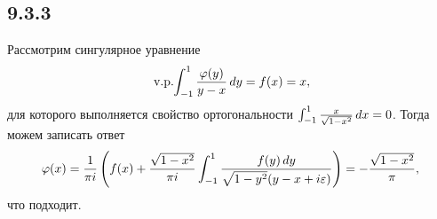 \subsection*{9.3.3}

Рассмотрим сингулярное уравнение
\begin{equation*}
	\,\textnormal{v.p.}\hspace{-2pt}\int_{-1}^{1} \frac{\varphi(y)}{y-x} \, d y = f(x) = x,
\end{equation*}
для которого выполняется свойство ортогональности $\int_{-1}^{1} \frac{x}{\sqrt{1-x^2}} \, d x = 0$. Тогда можем записать ответ
\begin{equation*}
	\varphi(x) = \frac{1}{\pi i} \left(
		f(x) + \frac{\sqrt{1-x^2}}{\pi i} \int_{-1}^{1} \frac{f(y) \, d y}{\sqrt{1-y^2} (y-x + i \varepsilon)}
	\right) = - \frac{\sqrt{1-x^2}}{\pi},
\end{equation*}
что подходит.

